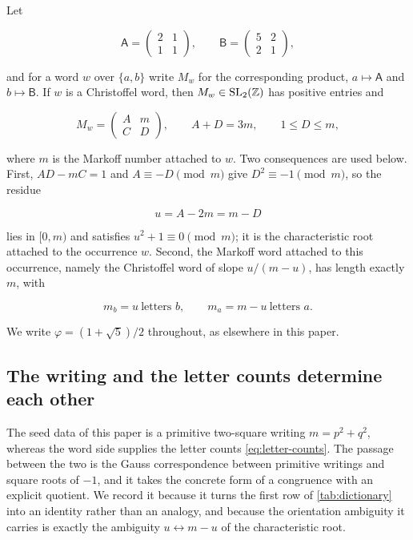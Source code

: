 Let

\begin{equation}
 \mathsf A=\begin{pmatrix}2&1\\1&1\end{pmatrix},
 \qquad
 \mathsf B=\begin{pmatrix}5&2\\2&1\end{pmatrix},
 \label{eq:cohn-generators}
\end{equation}

and for a word $w$ over $\{a,b\}$ write $M_w$ for the corresponding product,
$a\mapsto\mathsf A$ and $b\mapsto\mathsf B$. If $w$ is a Christoffel word,
then $M_w\in\mathrm{SL}_2(\mathbb{Z})$ has positive entries and

\begin{equation}
 M_w=\begin{pmatrix}A&m\\C&D\end{pmatrix},
 \qquad
 A+D=3m,
 \qquad
 1\leqslant D\leqslant m,
 \label{eq:cohn-normalisation}
\end{equation}

where $m$ is the Markoff number attached to $w$. Two consequences are used
below. First, $AD-mC=1$ and $A\equiv-D\pmod m$ give $D^2\equiv-1\pmod m$, so
the residue

\begin{equation}
 u=A-2m=m-D
 \label{eq:characteristic-root}
\end{equation}

lies in $[0,m)$ and satisfies $u^2+1\equiv0\pmod m$; it is the
characteristic root attached to the occurrence $w$. Second, the Markoff word
attached to this occurrence, namely the Christoffel word of slope
$u/(m-u)$, has length exactly $m$, with

\begin{equation}
 m_b=u\ \text{letters }b,
 \qquad
 m_a=m-u\ \text{letters }a.
 \label{eq:letter-counts}
\end{equation}

We write $\varphi=(1+\sqrt5)/2$ throughout, as elsewhere in this paper.

\subsection{The writing and the letter counts determine each other}

The seed data of this paper is a primitive two-square writing $m=p^2+q^2$,
whereas the word side supplies the letter counts \cref{eq:letter-counts}. The
passage between the two is the Gauss correspondence between primitive writings
and square roots of $-1$, and it takes the concrete form of a congruence with
an explicit quotient. We record it because it turns the first row of
\cref{tab:dictionary} into an identity rather than an analogy, and because the
orientation ambiguity it carries is exactly the ambiguity
$u\leftrightarrow m-u$ of the characteristic root.

